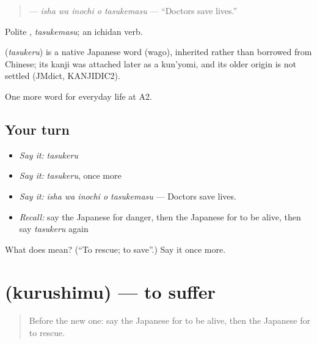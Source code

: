 \begin{quote}
\textbf{  } — \emph{isha wa inochi o tasukemasu} — \textquotedblleft{}Doctors save lives.\textquotedblright{}
\end{quote}

Polite \textbf{}, \emph{tasukemasu}; an ichidan verb.

\begin{cousinweb}
\textbf{} (\emph{tasukeru}) is a native Japanese word (wago), inherited rather than borrowed from Chinese; its kanji was attached later as a kun'yomi, and its older origin is not settled (JMdict, KANJIDIC2).
\end{cousinweb}

\begin{grammarlens}[title={What you've built}]
One more word for everyday life at A2.
\end{grammarlens}

\subsection*{Your turn}
\begin{itemize}
\raggedright
  \item \emph{Say it:} \emph{tasukeru}
  \item \emph{Say it:} \emph{tasukeru}, once more
  \item \emph{Say it:} \emph{isha wa inochi o tasukemasu} — Doctors save lives.
  \item \emph{Recall:} say the Japanese for danger, then the Japanese for to be alive, then say \emph{tasukeru} again
\end{itemize}

\begin{tcolorbox}[breakable,colback=teal!4,colframe=teal!35!black,title={Before you move on}]
What does  mean? (\textquotedblleft{}To rescue; to save\textquotedblright{}.) Say it once more.
\end{tcolorbox}
\section[\texorpdfstring{\ja{くるしむ} (kurushimu)}{くるしむ (kurushimu)}]{ (kurushimu) — to suffer}

\label{lesson:JA-C223-kurushimu}



\begin{quote}
Before the new one: say the Japanese for to be alive, then the Japanese for to rescue.
\end{quote}


